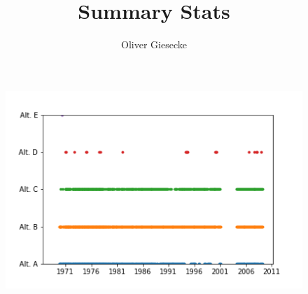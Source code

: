 \documentclass{article}
\begin{document}
\title{Summary Stats}
\author{Oliver Giesecke}


\maketitle 

\begin{table}[h!]
	\begin{center}
		
	\end{center}
\end{table}

\begin{table}[h!]
	\begin{center}
		
	\end{center}
\end{table}

\begin{figure}[h!]
	\begin{center}
		\includegraphics[scale=0.9]{../fig_alt_time.png}
	\end{center}
\end{figure}
\end{document}
